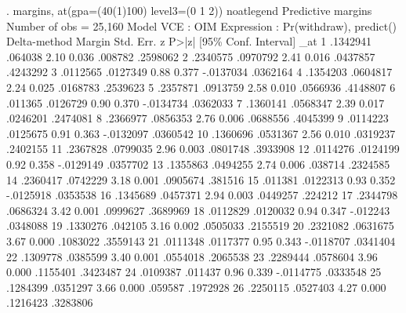 . margins, at(gpa=(40(1)100) level3=(0 1 2)) noatlegend
{\smallskip}
Predictive margins                              Number of obs     =     25,160
Model VCE    : OIM
{\smallskip}
Expression   : Pr(withdraw), predict()
{\smallskip}
             {\VBAR}            Delta-method
             {\VBAR}     Margin   Std. Err.      z    P>|z|     [95\% Conf. Interval]
         _at {\VBAR}
          1  {\VBAR}   .1342941    .064038     2.10   0.036      .008782    .2598062
          2  {\VBAR}   .2340575   .0970792     2.41   0.016     .0437857    .4243292
          3  {\VBAR}   .0112565   .0127349     0.88   0.377    -.0137034    .0362164
          4  {\VBAR}   .1354203   .0604817     2.24   0.025     .0168783    .2539623
          5  {\VBAR}   .2357871   .0913759     2.58   0.010     .0566936    .4148807
          6  {\VBAR}    .011365   .0126729     0.90   0.370    -.0134734    .0362033
          7  {\VBAR}   .1360141   .0568347     2.39   0.017     .0246201    .2474081
          8  {\VBAR}   .2366977   .0856353     2.76   0.006     .0688556    .4045399
          9  {\VBAR}   .0114223   .0125675     0.91   0.363    -.0132097    .0360542
         10  {\VBAR}   .1360696   .0531367     2.56   0.010     .0319237    .2402155
         11  {\VBAR}   .2367828   .0799035     2.96   0.003     .0801748    .3933908
         12  {\VBAR}   .0114276   .0124199     0.92   0.358    -.0129149    .0357702
         13  {\VBAR}   .1355863   .0494255     2.74   0.006      .038714    .2324585
         14  {\VBAR}   .2360417   .0742229     3.18   0.001     .0905674     .381516
         15  {\VBAR}    .011381   .0122313     0.93   0.352    -.0125918    .0353538
         16  {\VBAR}   .1345689   .0457371     2.94   0.003     .0449257     .224212
         17  {\VBAR}   .2344798   .0686324     3.42   0.001     .0999627    .3689969
         18  {\VBAR}   .0112829   .0120032     0.94   0.347     -.012243    .0348088
         19  {\VBAR}   .1330276    .042105     3.16   0.002     .0505033    .2155519
         20  {\VBAR}   .2321082   .0631675     3.67   0.000     .1083022    .3559143
         21  {\VBAR}   .0111348   .0117377     0.95   0.343    -.0118707    .0341404
         22  {\VBAR}   .1309778   .0385599     3.40   0.001     .0554018    .2065538
         23  {\VBAR}   .2289444   .0578604     3.96   0.000     .1155401    .3423487
         24  {\VBAR}   .0109387    .011437     0.96   0.339    -.0114775    .0333548
         25  {\VBAR}   .1284399   .0351297     3.66   0.000      .059587    .1972928
         26  {\VBAR}   .2250115   .0527403     4.27   0.000     .1216423    .3283806
